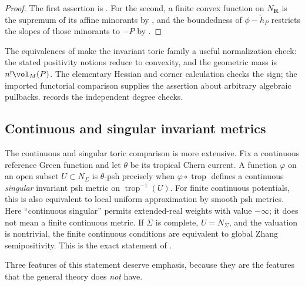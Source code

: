 \begin{proof}
The first assertion is .  For the second, a
finite convex function on $N_{\mathbf R}$ is the supremum of its affine
minorants by , and the boundedness of
$\phi-\check h_P$ restricts the slopes of those minorants to $-P$ by
.
\end{proof}

\begin{remark}
\label{rem:ch19-toric-no-content}
The equivalences of  make the invariant toric
family a useful normalization check: the stated positivity notions reduce
to convexity, and the geometric mass is $n!\vol_M(P)$.  The elementary
Hessian and corner calculation checks the sign; the imported functorial
comparison supplies the assertion about arbitrary algebraic pullbacks.
 records the independent degree checks.
\end{remark}

\subsection{Continuous and singular invariant metrics}
\label{sec:ch19-toric-continuous}

The continuous and singular toric comparison is more extensive.  Fix a
continuous reference Green function and let $\theta$ be its tropical Chern
current.  A function $\varphi$ on an open subset $U\subset N_\Sigma$ is
$\theta$-psh precisely when $\varphi\circ\operatorname{trop}$ defines a
continuous \emph{singular} invariant psh metric on
$\operatorname{trop}^{-1}(U)$.  For finite continuous potentials, this is
also equivalent to local uniform approximation by smooth psh metrics.
Here ``continuous singular'' permits extended-real weights with value
$-\infty$; it does not mean a finite continuous metric.  If
$\Sigma$ is complete, $U=N_\Sigma$, and the valuation is nontrivial,
the finite continuous conditions are
equivalent to global Zhang semipositivity.  This is the exact statement of
\cite[Theorem~5.3.11]{BGJKK25}.

Three features of this statement deserve emphasis, because they are the
features that the general theory does \emph{not} have.

